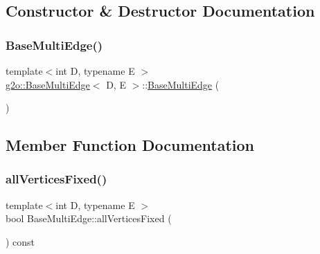 \subsection{Constructor \& Destructor Documentation}
\mbox{\label{classg2o_1_1_base_multi_edge_a761d6a3623ed2c4ce6c6535f78dac08d}} 
\subsubsection{\texorpdfstring{Base\+Multi\+Edge()}{BaseMultiEdge()}}
{\footnotesize\ttfamily template$<$int D, typename E $>$ \\
\mbox{\hyperlink{classg2o_1_1_base_multi_edge}{g2o\+::\+Base\+Multi\+Edge}}$<$ D, E $>$\+::\mbox{\hyperlink{classg2o_1_1_base_multi_edge}{Base\+Multi\+Edge}} (\begin{DoxyParamCaption}{ }\end{DoxyParamCaption})\hspace{0.3cm}{\ttfamily [inline]}}



\subsection{Member Function Documentation}
\mbox{\label{classg2o_1_1_base_multi_edge_a6e665877bd472839872077f5cc1ff2ec}} 
\subsubsection{\texorpdfstring{all\+Vertices\+Fixed()}{allVerticesFixed()}}
{\footnotesize\ttfamily template$<$int D, typename E $>$ \\
bool Base\+Multi\+Edge\+::all\+Vertices\+Fixed (\begin{DoxyParamCaption}{ }\end{DoxyParamCaption}) const\hspace{0.3cm}{\ttfamily [virtual]}}



